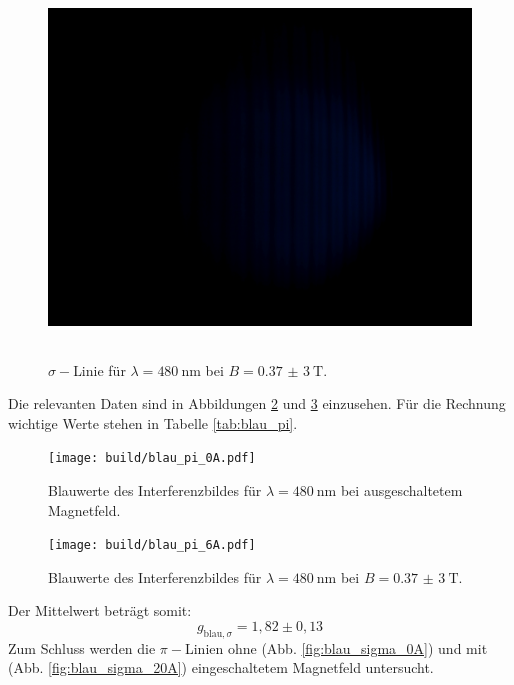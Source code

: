 \begin{figure}[htb]
  \centering
  \includegraphics[height=10cm]{content/pictures/blau_pi_6A.JPG}
  \caption{$\sigma-$Linie für $\lambda=\SI{480}{\nano\meter}$ bei $B=\SI{0,37(3)}{\tesla}$.}
  \label{fig:blau_pi_6A}
\end{figure}
Die relevanten Daten sind in Abbildungen \ref{fig:blau_pi_0A_plot} und \ref{fig:blau_pi_6A_plot} einzusehen.
Für die Rechnung wichtige Werte stehen in Tabelle \ref{tab:blau_pi}.
\begin{figure}[htb]
  \centering
  \texttt{[image: build/blau\_pi\_0A.pdf]}
  \caption{Blauwerte des Interferenzbildes für $\lambda=\SI{480}{\nano\meter}$ bei ausgeschaltetem Magnetfeld.}
  \label{fig:blau_pi_0A_plot}
\end{figure}
\begin{figure}[htb]
  \centering
  \texttt{[image: build/blau\_pi\_6A.pdf]}
  \caption{Blauwerte des Interferenzbildes für $\lambda=\SI{480}{\nano\meter}$ bei $B=\SI{0,37(3)}{\tesla}$.}
  \label{fig:blau_pi_6A_plot}
\end{figure}

Der Mittelwert beträgt somit:
\begin{equation}
\label{eqn:g_blau_sigma}
g_{\text{blau},\sigma}=1,82\pm0,13
\end{equation}
\FloatBarrier
Zum Schluss werden die $\pi-$Linien ohne (Abb. \ref{fig:blau_sigma_0A}) und mit (Abb. \ref{fig:blau_sigma_20A}) eingeschaltetem Magnetfeld untersucht.
